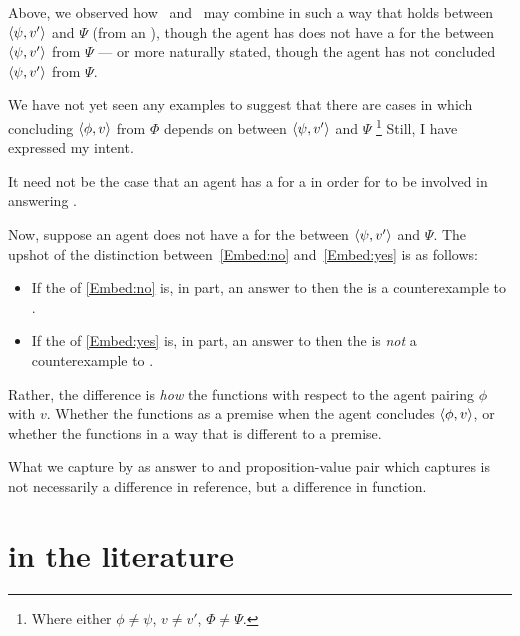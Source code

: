 \begin{note}
  Above, we observed how~\supportI{} and~\supportII{} may combine in such a way that \support{} holds between \(\langle \psi, v' \rangle\) and \(\Psi\) (from an \agpe{}), though the agent has does not have a  for the  between \(\langle \psi, v' \rangle\) from \(\Psi\) --- or more naturally stated, though the agent has not concluded \(\langle \psi, v' \rangle\) from \(\Psi\).

  We have not yet seen any examples to suggest that there are cases in which concluding \(\langle \phi, v \rangle\) from \(\Phi\) depends on \ros{} between \(\langle \psi, v' \rangle\) and \(\Psi\)%
  \footnote{
    Where either \(\phi \ne \psi\), \(v \ne v'\), \(\Phi \ne \Psi\).
  }
  Still, I have expressed my intent.

  It need not be the case that an agent has a  for a  in order for \ros{} to be involved in answering \qWhyVnP{}.
\end{note}

\begin{note}
  Now, suppose an agent does not have a  for the \ros{} between \(\langle \psi, v' \rangle\) and \(\Psi\).
  The upshot of the distinction between~\ref{Embed:no} and~\ref{Embed:yes} is as follows:

  \begin{itemize}
  \item
    If the  of \ref{Embed:no} is, in part, an answer to \qWhyVnP{} then the  is a counterexample to \issueConstraint{}.
  \item
    If the  of \ref{Embed:yes} is, in part, an answer to \qWhyVnP{} then the  is \emph{not} a counterexample to \issueConstraint{}.
  \end{itemize}


  Rather, the difference is \emph{how} the \ros{} functions with respect to the agent pairing \(\phi\) with \(v\).
  Whether the \ros{} functions as a premise when the agent concludes \(\langle \phi, v \rangle\), or whether the \ros{} functions in a way that is different to a premise.

  What we capture by \ros{} as answer to \qWhyVnP{} and proposition-value pair which captures \ros{} is not necessarily a difference in reference, but a difference in function.
\end{note}



\section{\issueConstraint{} in the literature}
\label{cha:clar:sec:literature}

